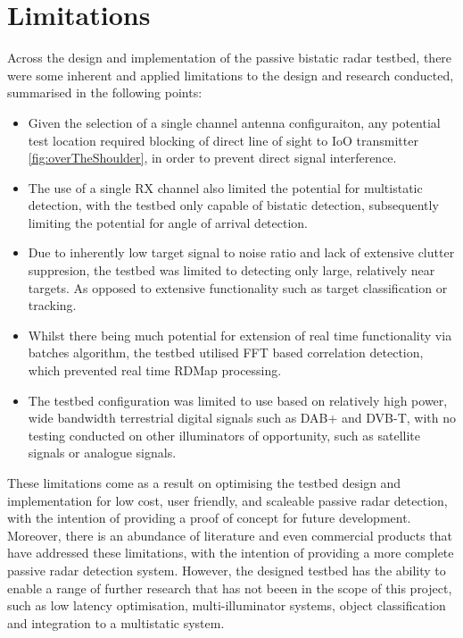 \section{Limitations \label{sec: limitations}}
Across the design and implementation of the passive bistatic radar testbed, there were some inherent and applied limitations to the design and research conducted, summarised in the following points:
\begin{itemize}
    \item Given the selection of a single channel antenna configuraiton, any potential test location required blocking of direct line of sight to IoO transmitter \ref{fig:overTheShoulder}, in order to prevent direct signal interference.
    \item The use of a single RX channel also limited the potential for multistatic detection, with the testbed only capable of bistatic detection, subsequently limiting the potential for angle of arrival detection. 
    \item Due to inherently low target signal to noise ratio and lack of extensive clutter suppresion, the testbed was limited to detecting only large, relatively near targets. As opposed to extensive functionality such as target classification or tracking.
    \item Whilst there being much potential for extension of real time functionality via batches algorithm, the testbed utilised FFT based correlation detection, which prevented real time RDMap processing. 
    \item The testbed configuration was limited to use based on relatively high power, wide bandwidth terrestrial digital signals such as DAB+ and DVB-T, with no testing conducted on other illuminators of opportunity, such as satellite signals or analogue signals.
\end{itemize}

These limitations come as a result on optimising the testbed design and implementation for low cost, user friendly, and scaleable passive radar detection, with the intention of providing a proof of concept for future development. Moreover, there is an abundance of literature and even commercial products that have addressed these limitations, with the intention of providing a more complete passive radar detection system. However, the designed testbed has the ability to enable a range of further research that has not beeen in the scope of this project, such as low latency optimisation, multi-illuminator systems, object classification and integration to a multistatic system.


